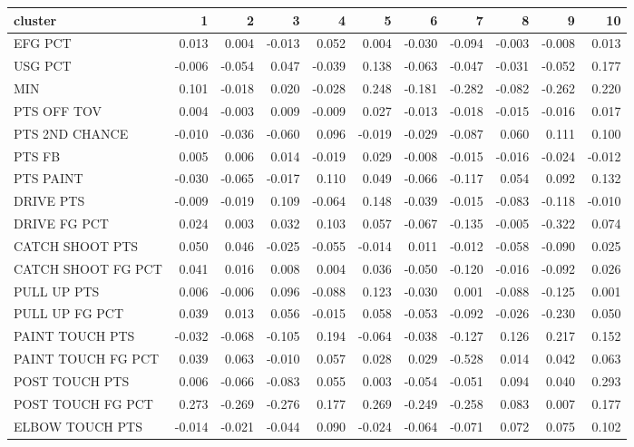 \begin{tabular}{lrrrrrrrrrr}
\toprule
cluster & 1 & 2 & 3 & 4 & 5 & 6 & 7 & 8 & 9 & 10 \\
\midrule
EFG PCT & 0.013 & 0.004 & -0.013 & 0.052 & 0.004 & -0.030 & -0.094 & -0.003 & -0.008 & 0.013 \\
USG PCT & -0.006 & -0.054 & 0.047 & -0.039 & 0.138 & -0.063 & -0.047 & -0.031 & -0.052 & 0.177 \\
MIN & 0.101 & -0.018 & 0.020 & -0.028 & 0.248 & -0.181 & -0.282 & -0.082 & -0.262 & 0.220 \\
PTS OFF TOV & 0.004 & -0.003 & 0.009 & -0.009 & 0.027 & -0.013 & -0.018 & -0.015 & -0.016 & 0.017 \\
PTS 2ND CHANCE & -0.010 & -0.036 & -0.060 & 0.096 & -0.019 & -0.029 & -0.087 & 0.060 & 0.111 & 0.100 \\
PTS FB & 0.005 & 0.006 & 0.014 & -0.019 & 0.029 & -0.008 & -0.015 & -0.016 & -0.024 & -0.012 \\
PTS PAINT & -0.030 & -0.065 & -0.017 & 0.110 & 0.049 & -0.066 & -0.117 & 0.054 & 0.092 & 0.132 \\
DRIVE PTS & -0.009 & -0.019 & 0.109 & -0.064 & 0.148 & -0.039 & -0.015 & -0.083 & -0.118 & -0.010 \\
DRIVE FG PCT & 0.024 & 0.003 & 0.032 & 0.103 & 0.057 & -0.067 & -0.135 & -0.005 & -0.322 & 0.074 \\
CATCH SHOOT PTS & 0.050 & 0.046 & -0.025 & -0.055 & -0.014 & 0.011 & -0.012 & -0.058 & -0.090 & 0.025 \\
CATCH SHOOT FG PCT & 0.041 & 0.016 & 0.008 & 0.004 & 0.036 & -0.050 & -0.120 & -0.016 & -0.092 & 0.026 \\
PULL UP PTS & 0.006 & -0.006 & 0.096 & -0.088 & 0.123 & -0.030 & 0.001 & -0.088 & -0.125 & 0.001 \\
PULL UP FG PCT & 0.039 & 0.013 & 0.056 & -0.015 & 0.058 & -0.053 & -0.092 & -0.026 & -0.230 & 0.050 \\
PAINT TOUCH PTS & -0.032 & -0.068 & -0.105 & 0.194 & -0.064 & -0.038 & -0.127 & 0.126 & 0.217 & 0.152 \\
PAINT TOUCH FG PCT & 0.039 & 0.063 & -0.010 & 0.057 & 0.028 & 0.029 & -0.528 & 0.014 & 0.042 & 0.063 \\
POST TOUCH PTS & 0.006 & -0.066 & -0.083 & 0.055 & 0.003 & -0.054 & -0.051 & 0.094 & 0.040 & 0.293 \\
POST TOUCH FG PCT & 0.273 & -0.269 & -0.276 & 0.177 & 0.269 & -0.249 & -0.258 & 0.083 & 0.007 & 0.177 \\
ELBOW TOUCH PTS & -0.014 & -0.021 & -0.044 & 0.090 & -0.024 & -0.064 & -0.071 & 0.072 & 0.075 & 0.102 \\

\end{tabular}
